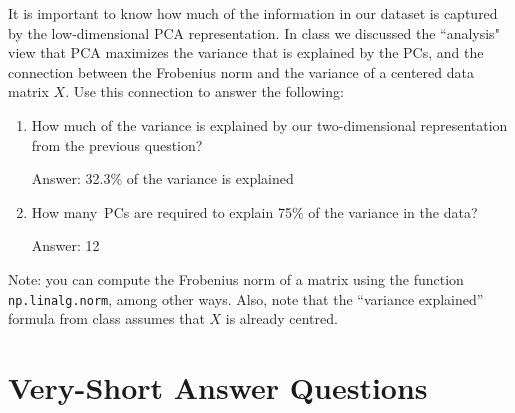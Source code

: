 \documentclass{article}
\def\ans#1{\par\gre{Answer: #1}}
\def\blu#1{{\color{blu}#1}}
\def\gre#1{{\color{gre}#1}}
\def\enum#1{\begin{enumerate}#1\end{enumerate}}
\begin{document}
It is important to know how much of the information in our dataset is captured by the low-dimensional PCA representation.
In class we discussed the ``analysis" view that PCA maximizes the variance that is explained by the PCs, and the connection between the Frobenius norm and the variance of a centered data matrix $X$. Use this connection to answer the following:
\blu{\enum{
\item How much of the variance is explained by our two-dimensional representation from the previous question?
\ans{32.3\% of the variance is explained}
\item How many\ PCs are required to explain 75\% of the variance in the data?
\ans{12}
}}
Note: you can compute the Frobenius norm of a matrix using the function \texttt{np.linalg.norm}, among other ways. Also, note that the ``variance explained'' formula from class assumes that $X$ is already centred.

\pagebreak

\section{Very-Short Answer Questions}
\end{document}
